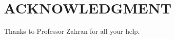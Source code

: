 \documentclass[letterpaper, 10 pt, conference]{ieeeconf}  %
\begin{document}
\addtolength{\textheight}{-12cm}   %









\section*{ACKNOWLEDGMENT}

Thanks to Professor Zahran for all your help.
\end{document}

